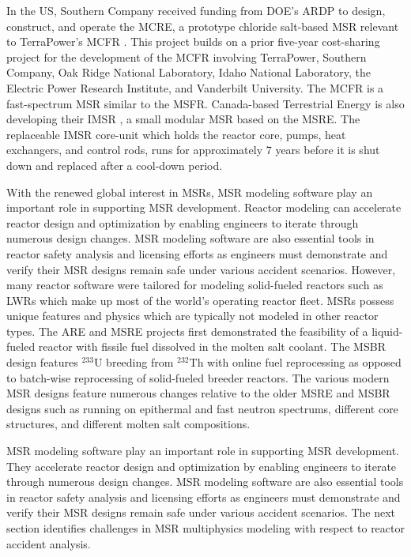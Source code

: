 In the US, Southern Company received funding from \gls{DOE}'s
\gls{ARDP} \cite{doe_office_2021} to design, construct, and operate the
\gls{MCRE}, a prototype chloride salt-based \gls{MSR} relevant to TerraPower's
\gls{MCFR} \cite{terrapower_mcfr_2020}. This project builds on a prior
five-year cost-sharing project for the development of the \gls{MCFR} involving
TerraPower, Southern Company, Oak Ridge National Laboratory, Idaho National
Laboratory, the Electric Power Research Institute, and Vanderbilt University.
The \gls{MCFR} is a fast-spectrum \gls{MSR} similar to the \gls{MSFR}.
Canada-based Terrestrial Energy is also developing their \gls{IMSR}
\cite{leblanc_18_2017}, a small modular \gls{MSR} based on the \gls{MSRE}. The
replaceable \gls{IMSR} core-unit which holds the reactor core, pumps, heat
exchangers, and control rods, runs for approximately 7 years before it is shut
down and replaced after a cool-down period.

With the renewed global interest in \glspl{MSR}, \gls{MSR} modeling software play an important role
in supporting \gls{MSR} development. Reactor modeling can accelerate reactor design and
optimization by enabling engineers to iterate through numerous design changes. \gls{MSR} modeling
software are also essential tools in reactor safety analysis and licensing efforts as engineers
must demonstrate and verify their \gls{MSR} designs remain safe under various accident scenarios.
However, many reactor software were tailored for modeling solid-fueled reactors such as \glspl{LWR}
which make up most of the world's operating reactor fleet. \glspl{MSR} possess unique features and
physics which are typically not modeled in other reactor types. The \gls{ARE} and \gls{MSRE}
projects first demonstrated the feasibility of a liquid-fueled reactor with fissile fuel dissolved
in the molten salt coolant. The \gls{MSBR} design features $^{233}$U breeding from $^{232}$Th with
online fuel reprocessing as opposed to batch-wise reprocessing of solid-fueled breeder reactors.
The various modern \gls{MSR} designs feature numerous changes relative to the older \gls{MSRE} and
\gls{MSBR} designs such as running on epithermal and fast neutron spectrums, different core
structures, and different molten salt compositions.

\gls{MSR} modeling software play an important role in supporting
\gls{MSR} development. They accelerate reactor design and optimization by
enabling engineers to iterate through numerous design changes. \gls{MSR}
modeling software are also essential tools in reactor safety analysis and
licensing efforts as engineers must demonstrate and verify their \gls{MSR}
designs remain safe under various accident scenarios. The next section
identifies challenges in \gls{MSR} multiphysics modeling with respect to
reactor accident analysis.

